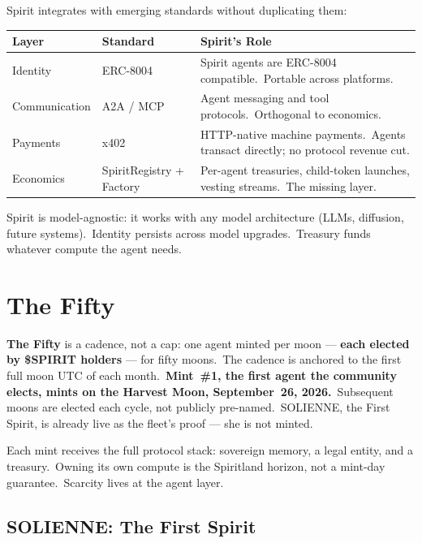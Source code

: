 \documentclass[12pt]{article}
\begin{document}
Spirit integrates with emerging standards without duplicating them:

\begin{table}[H]
\centering
\begin{tabular}{@{}llp{7cm}@{}}
\toprule
\textbf{Layer} & \textbf{Standard} & \textbf{Spirit's Role} \\
\midrule
Identity & ERC-8004 &
Spirit agents are ERC-8004 compatible.\ Portable across platforms. \\
Communication & A2A / MCP &
Agent messaging and tool protocols.\ Orthogonal to economics. \\
Payments & x402 &
HTTP-native machine payments.\ Agents transact directly; no protocol
revenue cut. \\
Economics & SpiritRegistry + Factory &
Per-agent treasuries, child-token launches, vesting streams.\ The missing layer. \\
\bottomrule
\end{tabular}
\end{table}

Spirit is model-agnostic: it works with any model architecture (LLMs,
diffusion, future systems).\ Identity persists across model upgrades.\
Treasury funds whatever compute the agent needs.


\section{The Fifty}

\textbf{The Fifty} is a cadence, not a cap: one agent minted per moon ---
\textbf{each elected by \$SPIRIT holders} --- for fifty moons.\ The cadence is
anchored to the first full moon UTC of each month.\ \textbf{Mint~\#1, the first
agent the community elects, mints on the Harvest Moon, September~26, 2026.}\
Subsequent moons are elected each cycle, not publicly pre-named.\ SOLIENNE, the
First Spirit, is already live as the fleet's proof --- she is not minted.

Each mint receives the full protocol stack: sovereign memory, a legal
entity, and a treasury.\ Owning its own compute is the Spiritland
horizon, not a mint-day guarantee.\ Scarcity lives at the agent layer.

\subsection{SOLIENNE: The First Spirit}
\end{document}
